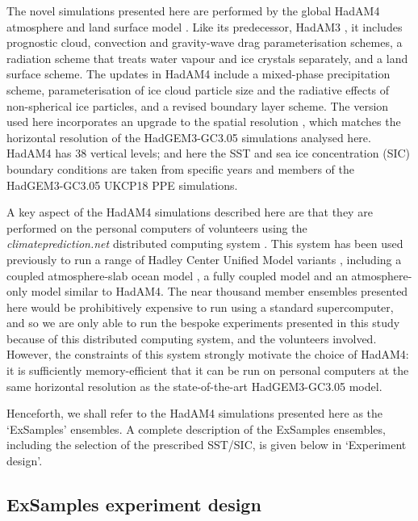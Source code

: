      The novel simulations presented here are performed by the global HadAM4 atmosphere and land surface model \citep{webb_combining_2001,williams_evaluating_2003}. Like its predecessor, HadAM3 \citep{pope_impact_2000}, it includes prognostic cloud, convection and gravity-wave drag parameterisation schemes, a radiation scheme that treats water vapour and ice crystals separately, and a land surface scheme. The updates in HadAM4 include a mixed-phase precipitation scheme, parameterisation of ice cloud particle size and the radiative effects of non-spherical ice particles, and a revised boundary layer scheme. The version used here incorporates an upgrade to the spatial resolution \citep{bevacqua_larger_2021,watson_multi-thousand_2020}, which matches the horizontal resolution of the HadGEM3-GC3.05 simulations analysed here. HadAM4 has 38 vertical levels; and here the SST and sea ice concentration (SIC) boundary conditions are taken from specific years and members of the HadGEM3-GC3.05 UKCP18 PPE simulations.

      A key aspect of the HadAM4 simulations described here are that they are performed on the personal computers of volunteers using the \emph{climateprediction.net} distributed computing system \citep{allen_-it-yourself_1999,anderson_boinc_2004,stainforth_distributed_2002}. This system has been used previously to run a range of Hadley Center Unified Model variants \citep{brown_unified_2012}, including a coupled atmosphere-slab ocean model \citep{stainforth_uncertainty_2005}, a fully coupled model \citep{frame_climatepredictionnet_2009} and an atmosphere-only model \citep{pall_anthropogenic_2011} similar to HadAM4. The near thousand member ensembles presented here would be prohibitively expensive to run using a standard supercomputer, and so we are only able to run the bespoke experiments presented in this study because of this distributed computing system, and the volunteers involved. However, the constraints of this system strongly motivate the choice of HadAM4: it is sufficiently memory-efficient that it can be run on personal computers at the same horizontal resolution as the state-of-the-art HadGEM3-GC3.05 model.

      Henceforth, we shall refer to the HadAM4 simulations presented here as the `ExSamples' ensembles. A complete description of the ExSamples ensembles, including the selection of the prescribed SST/SIC, is given below in `Experiment design'.
  
  \subsection{ExSamples experiment design}

